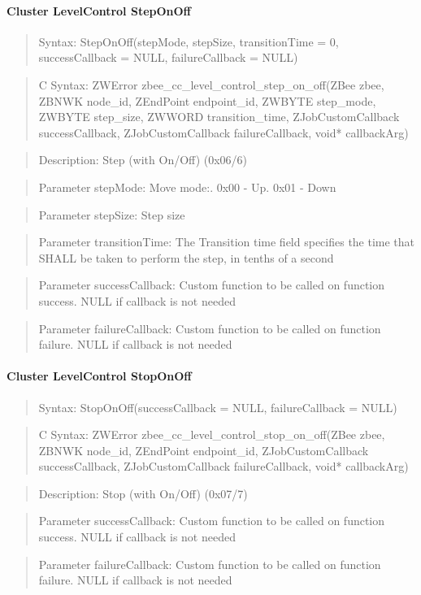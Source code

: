 \paragraph{Cluster LevelControl StepOnOff}
\begin{quote}Syntax: StepOnOff(stepMode, stepSize, transitionTime = 0, successCallback = NULL, failureCallback = NULL)\end{quote}
\begin{quote}C Syntax: ZWError zbee\_cc\_level\_control\_step\_on\_off(ZBee zbee, ZBNWK node\_id, ZEndPoint endpoint\_id, ZWBYTE step\_mode, ZWBYTE step\_size, ZWWORD transition\_time, ZJobCustomCallback successCallback, ZJobCustomCallback failureCallback, void* callbackArg)\end{quote}
\begin{quote}Description: Step (with On/Off) (0x06/6)\end{quote}
\begin{quote}Parameter stepMode: Move mode:. 0x00 - Up. 0x01 - Down\end{quote}
\begin{quote}Parameter stepSize: Step size\end{quote}
\begin{quote}Parameter transitionTime: The Transition time field specifies the time that SHALL be taken to perform the step, in tenths of a second\end{quote}
\begin{quote}Parameter successCallback: Custom function to be called on function success. NULL if callback is not needed\end{quote}
\begin{quote}Parameter failureCallback: Custom function to be called on function failure. NULL if callback is not needed\end{quote}


\paragraph{Cluster LevelControl StopOnOff}
\begin{quote}Syntax: StopOnOff(successCallback = NULL, failureCallback = NULL)\end{quote}
\begin{quote}C Syntax: ZWError zbee\_cc\_level\_control\_stop\_on\_off(ZBee zbee, ZBNWK node\_id, ZEndPoint endpoint\_id, ZJobCustomCallback successCallback, ZJobCustomCallback failureCallback, void* callbackArg)\end{quote}
\begin{quote}Description: Stop (with On/Off) (0x07/7)\end{quote}
\begin{quote}Parameter successCallback: Custom function to be called on function success. NULL if callback is not needed\end{quote}
\begin{quote}Parameter failureCallback: Custom function to be called on function failure. NULL if callback is not needed\end{quote}

